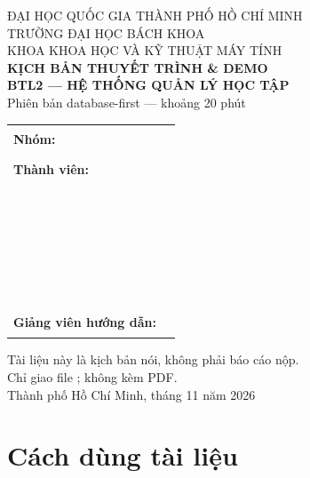 \documentclass[a4paper,13pt]{extarticle}
\newcommand{\code}[1]{\texttt{\detokenize{#1}}}
\begin{document}
\sloppy
\setlength{\emergencystretch}{3em}

\begin{titlepage}
\begin{center}
    {\Large ĐẠI HỌC QUỐC GIA THÀNH PHỐ HỒ CHÍ MINH}\\[0.25cm]
    {\Large TRƯỜNG ĐẠI HỌC BÁCH KHOA}\\[0.25cm]
    {\large KHOA KHOA HỌC VÀ KỸ THUẬT MÁY TÍNH}\\[1.2cm]

    {\Huge\bfseries KỊCH BẢN THUYẾT TRÌNH \& DEMO}\\[0.4cm]
    {\LARGE\bfseries BTL2 --- HỆ THỐNG QUẢN LÝ HỌC TẬP}\\[0.35cm]
    {\large Phiên bản database-first --- khoảng 20 phút}\\[1.4cm]

    \begin{tabular}{@{}ll@{}}
        \textbf{Nhóm:} & \rule{7cm}{0.4pt} \\[0.25cm]
        \textbf{Thành viên:} & \rule{7cm}{0.4pt} \\[0.25cm]
        & \rule{7cm}{0.4pt} \\[0.25cm]
        & \rule{7cm}{0.4pt} \\[0.25cm]
        & \rule{7cm}{0.4pt} \\[0.25cm]
        & \rule{7cm}{0.4pt} \\[0.25cm]
        \textbf{Giảng viên hướng dẫn:} & \rule{7cm}{0.4pt} \\
    \end{tabular}

    \vfill
    {\small Tài liệu này là kịch bản nói, không phải báo cáo nộp.\\
    Chỉ giao file \code{.tex}; không kèm PDF.}\\[0.4cm]
    {\small Thành phố Hồ Chí Minh, tháng 11 năm 2026}
\end{center}
\end{titlepage}

\tableofcontents
\clearpage

\section*{Cách dùng tài liệu}
\end{document}
